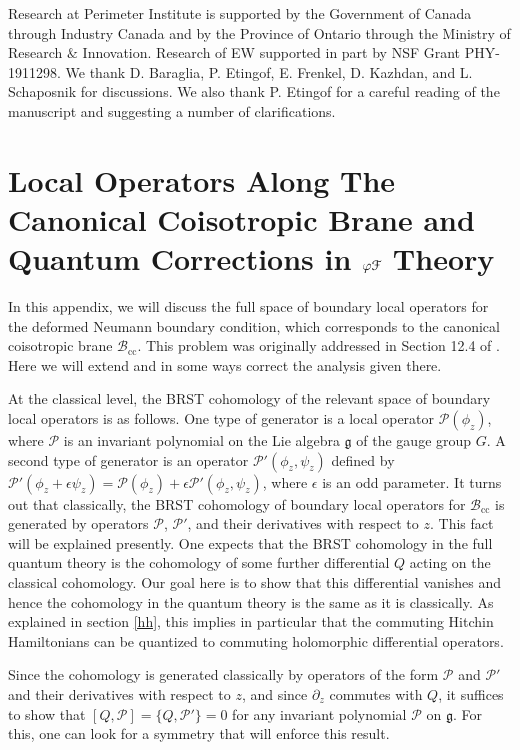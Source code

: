 \documentclass[11pt,a4paper]{article}
\begin{document}
Research at Perimeter Institute is supported by the Government of Canada through Industry Canada and by the Province of Ontario 
through the Ministry of Research $\&$ Innovation.
Research  of EW supported in part by  NSF Grant PHY-1911298.   We thank D. Baraglia, P. Etingof, E. Frenkel, D. Kazhdan, and L. Schaposnik for discussions.
We also thank P. Etingof for a careful reading of the manuscript and suggesting a number of clarifications.

\appendix


\section{Local Operators Along The Canonical Coisotropic Brane and Quantum Corrections in $\varphi {\cal F}$ Theory}\label{coho}
In this appendix, we will discuss the full space of boundary local operators for the deformed Neumann boundary condition,
which corresponds to the canonical coisotropic brane ${\mathcal B}_{\mathrm{cc}}$. This problem was originally addressed in Section 12.4 of \cite{KW}. 
Here we will extend and in some ways correct the analysis given there.

At the classical level, the BRST cohomology of the relevant space of boundary local operators is as follows.   One type of generator is a local operator ${\mathcal P}(\phi_z)$,
where ${\mathcal P}$ is an invariant polynomial on the Lie algebra $\mathfrak g$ of the gauge group $G$.    A second type of generator is an operator
${\mathcal P}'(\phi_z,\psi_z)$ defined by  ${\mathcal P}'(\phi_z+\epsilon\psi_z)={\mathcal P}(\phi_z)+\epsilon {\mathcal P}'(\phi_z,\psi_z)$, where $\epsilon$ is
an odd parameter.   It turns out that classically, the BRST cohomology of boundary local operators for ${\mathcal B}_{\mathrm{cc}}$ is generated by operators ${\mathcal P}$,
${\mathcal P}'$, and their derivatives with respect to $z$.    This fact will be explained presently.  
One expects that the BRST cohomology in the full quantum theory is the cohomology of some further differential $Q$ acting on the classical cohomology.   Our goal here
is to show that this differential vanishes and hence the cohomology in the quantum theory is the same as it is classically.  As explained in section \ref{hh}, this implies
in particular that the commuting Hitchin Hamiltonians can be quantized to commuting holomorphic differential operators.

Since the cohomology is generated classically by operators of the form $\mathcal P$ and $\mathcal P'$ and their derivatives with respect to $z$,
and since $\partial_z$ commutes with $Q$, it suffices to show that $[Q,\mathcal P]=\{Q,\mathcal P'\}=0$ for any invariant polynomial $\mathcal P$ on $\mathfrak g$.
For this, one can look for a symmetry that will enforce this result.
\end{document}
